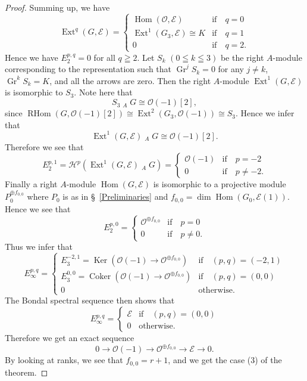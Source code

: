 \documentclass[a4paper,12pt]{amsart}
\DeclareMathOperator{\Hom}{Hom}
\DeclareMathOperator{\Ext}{Ext}
\DeclareMathOperator{\RHom}{RHom}
\DeclareMathOperator{\lotimes}{\otimes^{\mathbb{L}}}
\DeclareMathOperator{\Ker}{Ker}
\DeclareMathOperator{\Coker}{Coker}
\DeclareMathOperator{\Gr}{Gr}
\begin{document}
\begin{proof}
Summing up, we have
\[\Ext^q(G,\mathcal{E})=
\begin{cases}
\Hom(\mathcal{O},\mathcal{E})& \textrm{if}\quad  q=0\\
\Ext^{1}(G_3,\mathcal{E})\cong K& \textrm{if}\quad  q= 1\\
0& \textrm{if}\quad  q= 2.
\end{cases}
\]
Hence we have 
$E_2^{p,q}=0$ for all $q\geqq 2$.
Let $S_k$ $(0\leqq k\leqq 3)$ be the right $A$-module corresponding to the representation such that 
$\Gr^jS_k=0$ for any $j\neq k$, $\Gr^kS_k=K$, and all the arrows are zero.
Then the right $A$-module $\Ext^1(G,\mathcal{E})$ is isomorphic to $S_3$.
Note here that 
\[S_3\lotimes_AG\cong \mathcal{O}(-1)[2],\]
since $\RHom(G,\mathcal{O}(-1)[2])\cong \Ext^2(G_3,\mathcal{O}(-1))\cong S_3$.
Hence we infer that 
\[\Ext^1(G,\mathcal{E})\lotimes_A G\cong \mathcal{O}(-1)[2].\] 
Therefore we see that 
\[
E_2^{p,1}=\mathcal{H}^p(\Ext^1(G,\mathcal{E})\lotimes_A G)
=
\begin{cases}
\mathcal{O}(-1)& \textrm{if}\quad  p= -2\\
0& \textrm{if}\quad  p\neq -2.
\end{cases}
\]
Finally 
a right $A$-module $\Hom(G,\mathcal{E})$ 
is isomorphic to a projective module $P_0^{\oplus f_{0,0}}$
where $P_0$ is as in \S~\ref{Preliminaries}
and $f_{0,0}=\dim \Hom(G_0, \mathcal{E}(1))$.
Hence we see that
\[E_2^{p,0}=
\begin{cases}
\mathcal{O}^{\oplus f_{0,0}}& \textrm{if}\quad  p= 0\\
0& \textrm{if}\quad p\neq 0.
\end{cases}
\]
Thus we infer that
\[E_{\infty}^{p,q}=
\begin{cases}
E_3^{-2,1}=\Ker (\mathcal{O}(-1)\to \mathcal{O}^{\oplus f_{0,0}})& \textrm{if}\quad  (p,q)= (-2,1)\\
E_3^{0,0}=\Coker (\mathcal{O}(-1)\to \mathcal{O}^{\oplus f_{0,0}})& \textrm{if}\quad  (p,q)= (0,0)\\
0&\textrm{otherwise}.
\end{cases}
\]
The Bondal spectral sequence then shows that
\[E_{\infty}^{p,q}=
\begin{cases}
\mathcal{E}& \textrm{if}\quad  (p,q)= (0,0)\\
0&\textrm{otherwise}.
\end{cases}
\]
Therefore we get an exact sequence
\[
0\to \mathcal{O}(-1)\to \mathcal{O}^{\oplus f_{0,0}}
\to \mathcal{E}\to 0.\]
By looking at ranks, we see that $f_{0,0}=r+1$,
and we get the case (3) of the theorem.
\end{proof}
\end{document}
